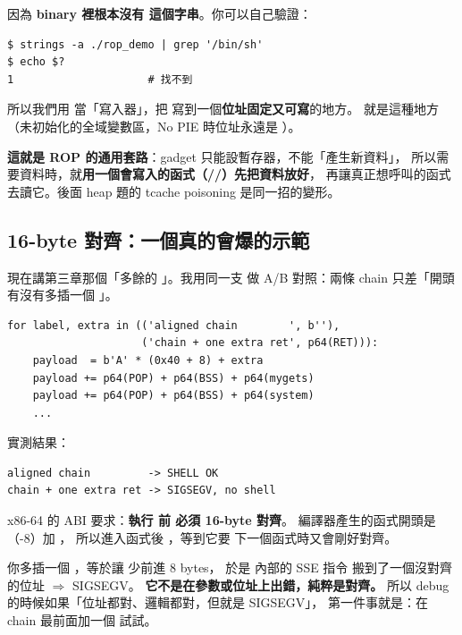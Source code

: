 \begin{whybox}
因為 \textbf{binary 裡根本沒有  這個字串}。你可以自己驗證：

\begin{lstlisting}[style=sh]
$ strings -a ./rop_demo | grep '/bin/sh'
$ echo $?
1                     # 找不到
\end{lstlisting}

所以我們用  當「寫入器」，把  寫到一個\textbf{位址固定又可寫}的地方。
 就是這種地方（未初始化的全域變數區，No PIE 時位址永遠是 ）。

\textbf{這就是 ROP 的通用套路}：gadget 只能設暫存器，不能「產生新資料」，
所以需要資料時，就\textbf{用一個會寫入的函式（//）先把資料放好}，
再讓真正想呼叫的函式去讀它。後面 heap 題的 tcache poisoning 是同一招的變形。
\end{whybox}

\subsection{16-byte 對齊：一個真的會爆的示範}

現在講第三章那個「多餘的 」。我用同一支 
做 A/B 對照：兩條 chain 只差「開頭有沒有多插一個 」。

\begin{lstlisting}[style=py]
for label, extra in (('aligned chain        ', b''),
                     ('chain + one extra ret', p64(RET))):
    payload  = b'A' * (0x40 + 8) + extra
    payload += p64(POP) + p64(BSS) + p64(mygets)
    payload += p64(POP) + p64(BSS) + p64(system)
    ...
\end{lstlisting}

實測結果：

\begin{lstlisting}[style=raw]
aligned chain         -> SHELL OK
chain + one extra ret -> SIGSEGV, no shell
\end{lstlisting}

\begin{whybox}
x86-64 的 ABI 要求：\textbf{執行  前  必須 16-byte 對齊}。
編譯器產生的函式開頭是 （-8）加 ，
所以進入函式後 ，等到它要  下一個函式時又會剛好對齊。

你多插一個 ，等於讓  少前進 8 bytes，
於是  內部的 SSE 指令  搬到了一個沒對齊的位址 $\Rightarrow$ SIGSEGV。
\textbf{它不是在參數或位址上出錯，純粹是對齊。}
所以 debug 的時候如果「位址都對、邏輯都對，但就是 SIGSEGV」，
第一件事就是：在 chain 最前面加一個  試試。
\end{whybox}

